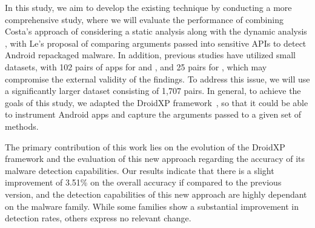 In this study, we aim to develop the existing technique by conducting a more comprehensive study, where we will evaluate the performance of combining Costa's approach of considering a static analysis along with the dynamic analysis \cite{costa_exploring_2022}, with Le's proposal of comparing arguments passed into sensitive APIs \cite{le_towards_2018} to detect Android repackaged malware. In addition, previous studies have utilized small datasets, with 102 pairs of apps for \cite{bao_mining_2018} and \cite{costa_exploring_2022}, and 25 pairs for \cite{le_towards_2018}, which may compromise the external validity of the findings. To address this issue, we will use a significantly larger dataset consisting of 1,707 pairs. In general, to achieve the goals of this study, we adapted the  DroidXP framework~\cite{costa_droidxp_2020}, so that it could be able to instrument Android apps and capture the arguments passed to a given set of methods.

The primary contribution of this work lies on the evolution of the DroidXP framework and the evaluation of this new approach regarding the accuracy of its malware detection capabilities. Our results indicate that there is a slight improvement of 3.51\% on the overall accuracy if compared to the previous version, and the detection capabilities of this new approach are highly dependant on the malware family. While some families show a substantial improvement in detection rates, others express no relevant change.

